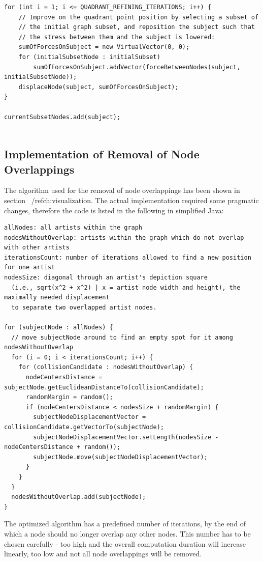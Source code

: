 \begin{verbatim}
for (int i = 1; i <= QUADRANT_REFINING_ITERATIONS; i++) {
    // Improve on the quadrant point position by selecting a subset of
    // the initial graph subset, and reposition the subject such that
    // the stress between them and the subject is lowered:
    sumOfForcesOnSubject = new VirtualVector(0, 0);
    for (initialSubsetNode : initialSubset)
        sumOfForcesOnSubject.addVector(forceBetweenNodes(subject, initialSubsetNode));
    displaceNode(subject, sumOfForcesOnSubject);
}

currentSubsetNodes.add(subject);
	
\end{verbatim}

\subsection{Implementation of Removal of Node Overlappings}
\label{subch:implementation-overlapping}

The algorithm used for the removal of node overlappings has been shown in section ~/ref{ch:visualization}. The actual implementation required some pragmatic changes, therefore the code is listed in the following in simplified Java:

\begin{verbatim}
allNodes: all artists within the graph
nodesWithoutOverlap: artists within the graph which do not overlap with other artists
iterationsCount: number of iterations allowed to find a new position for one artist
nodesSize: diagonal through an artist's depiction square 
  (i.e., sqrt(x^2 + x^2) | x = artist node width and height), the maximally needed displacement
  to separate two overlapped artist nodes.
	
for (subjectNode : allNodes) {
  // move subjectNode around to find an empty spot for it among nodesWithoutOverlap
  for (i = 0; i < iterationsCount; i++) {
    for (collisionCandidate : nodesWithoutOverlap) {
      nodeCentersDistance = subjectNode.getEuclideanDistanceTo(collisionCandidate);
      randomMargin = random();
      if (nodeCentersDistance < nodesSize + randomMargin) {
        subjectNodeDisplacementVector = collisionCandidate.getVectorTo(subjectNode);
        subjectNodeDisplacementVector.setLength(nodesSize - nodeCentersDistance + random()); 
        subjectNode.move(subjectNodeDisplacementVector);
      }
    }
  }
  nodesWithoutOverlap.add(subjectNode);
}
\end{verbatim}

The optimized algorithm has a predefined number of iterations, by the end of which a node should no longer overlap any other nodes. This number has to be chosen carefully - too high and the overall computation duration will increase linearly, too low and not all node overlappings will be removed.

